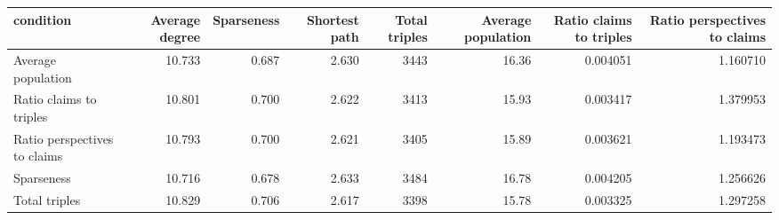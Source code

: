 \begin{tabular}{lrrrrrrr}
\toprule
                   condition &  Average degree &  Sparseness &  Shortest path &  Total triples &  Average population &  Ratio claims to triples &  Ratio perspectives to claims \\
\midrule
          Average population &          10.733 &       0.687 &          2.630 &           3443 &               16.36 &                 0.004051 &                      1.160710 \\
     Ratio claims to triples &          10.801 &       0.700 &          2.622 &           3413 &               15.93 &                 0.003417 &                      1.379953 \\
Ratio perspectives to claims &          10.793 &       0.700 &          2.621 &           3405 &               15.89 &                 0.003621 &                      1.193473 \\
                  Sparseness &          10.716 &       0.678 &          2.633 &           3484 &               16.78 &                 0.004205 &                      1.256626 \\
               Total triples &          10.829 &       0.706 &          2.617 &           3398 &               15.78 &                 0.003325 &                      1.297258 \\
\bottomrule
\end{tabular}
